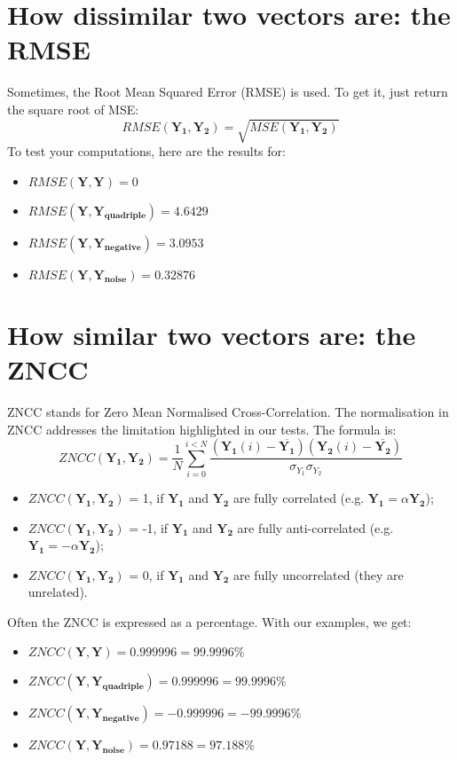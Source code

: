 \documentclass[english,a4paper,12pt,oneside]{article}
\begin{document}
\section{How dissimilar two vectors are: the RMSE}

Sometimes, the Root Mean Squared Error (RMSE) is used. To get it, just return the square root of MSE:
\begin{equation}
RMSE(\mathbf{Y_1}, \mathbf{Y_2}) = \sqrt{MSE(\mathbf{Y_1}, \mathbf{Y_2})}
\end{equation}
To test your computations, here are the results for:
\begin{itemize}
\item $RMSE(\mathbf{Y}, \mathbf{Y}) =  0$
\item $RMSE(\mathbf{Y}, \mathbf{Y_{quadriple}}) =  4.6429$
\item $RMSE(\mathbf{Y}, \mathbf{Y_{negative}}) =  3.0953$
\item $RMSE(\mathbf{Y}, \mathbf{Y_{noise}}) =  0.32876$
\end{itemize}


\section{How similar two vectors are: the ZNCC}

ZNCC stands for Zero Mean Normalised Cross-Correlation. 
The normalisation in ZNCC addresses the limitation highlighted in our tests. 
The formula is:
\begin{equation}
ZNCC(\mathbf{Y_1}, \mathbf{Y_2}) = \frac{1}{N}\sum^{i < N}_{i=0} \frac{(\mathbf{Y_1}(i)-\overline{\mathbf{Y_1}})(\mathbf{Y_2}(i)-\overline{\mathbf{Y_2}})}{\sigma_{Y_1}\sigma_{Y_2}}
\end{equation}
\begin{itemize}
\item $ZNCC(\mathbf{Y_1}, \mathbf{Y_2})$ = 1, if $\mathbf{Y_1}$ and $\mathbf{Y_2}$ are fully correlated (e.g. $\mathbf{Y_1} = \alpha \mathbf{Y_2}$);
\item $ZNCC(\mathbf{Y_1}, \mathbf{Y_2})$ = -1, if $\mathbf{Y_1}$ and $\mathbf{Y_2}$ are fully anti-correlated (e.g. $\mathbf{Y_1} = -\alpha \mathbf{Y_2}$);
\item $ZNCC(\mathbf{Y_1}, \mathbf{Y_2})$ = 0, if $\mathbf{Y_1}$ and $\mathbf{Y_2}$ are fully uncorrelated (they are unrelated).
\end{itemize}
Often the ZNCC is expressed as a percentage. 
With our examples, we get:
\begin{itemize}
\item $ZNCC(\mathbf{Y}, \mathbf{Y}) = 0.999996 =	99.9996\%$
\item $ZNCC(\mathbf{Y}, \mathbf{Y_{quadriple}}) = 0.999996 =	99.9996\%$
\item $ZNCC(\mathbf{Y}, \mathbf{Y_{negative}}) = -0.999996 =	-99.9996\%$
\item $ZNCC(\mathbf{Y}, \mathbf{Y_{noise}}) =  0.97188 =	97.188\%$
\end{itemize}
\end{document}
